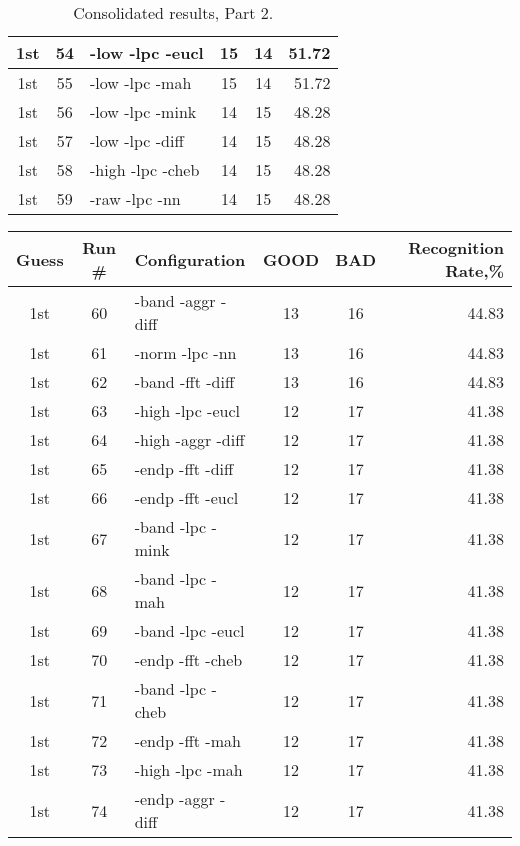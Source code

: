 \begin{table}
\begin{minipage}[b]{\textwidth}
\begin{tabular}{|c|c|l|c|c|r|}
1st & 54 & -low -lpc -eucl  & 15 & 14 & 51.72\\ \hline
1st & 55 & -low -lpc -mah  & 15 & 14 & 51.72\\ \hline
1st & 56 & -low -lpc -mink  & 14 & 15 & 48.28\\ \hline
1st & 57 & -low -lpc -diff  & 14 & 15 & 48.28\\ \hline
1st & 58 & -high -lpc -cheb  & 14 & 15 & 48.28\\ \hline
1st & 59 & -raw -lpc -nn  & 14 & 15 & 48.28\\ \hline
\end{tabular}
\end{minipage}
\caption{Consolidated results, Part 2.}
\label{tab:results2}
\end{table}

\begin{table}
\begin{minipage}[b]{\textwidth}
\centering
\begin{tabular}{|c|c|l|c|c|r|} \hline
Guess & Run \# & Configuration & GOOD & BAD & Recognition Rate,\%\\ \hline\hline
1st & 60 & -band -aggr -diff  & 13 & 16 & 44.83\\ \hline
1st & 61 & -norm -lpc -nn  & 13 & 16 & 44.83\\ \hline
1st & 62 & -band -fft -diff  & 13 & 16 & 44.83\\ \hline
1st & 63 & -high -lpc -eucl  & 12 & 17 & 41.38\\ \hline
1st & 64 & -high -aggr -diff  & 12 & 17 & 41.38\\ \hline
1st & 65 & -endp -fft -diff  & 12 & 17 & 41.38\\ \hline
1st & 66 & -endp -fft -eucl  & 12 & 17 & 41.38\\ \hline
1st & 67 & -band -lpc -mink  & 12 & 17 & 41.38\\ \hline
1st & 68 & -band -lpc -mah  & 12 & 17 & 41.38\\ \hline
1st & 69 & -band -lpc -eucl  & 12 & 17 & 41.38\\ \hline
1st & 70 & -endp -fft -cheb  & 12 & 17 & 41.38\\ \hline
1st & 71 & -band -lpc -cheb  & 12 & 17 & 41.38\\ \hline
1st & 72 & -endp -fft -mah  & 12 & 17 & 41.38\\ \hline
1st & 73 & -high -lpc -mah  & 12 & 17 & 41.38\\ \hline
1st & 74 & -endp -aggr -diff  & 12 & 17 & 41.38\\ \hline

\end{tabular}
\end{minipage}
\end{table}
